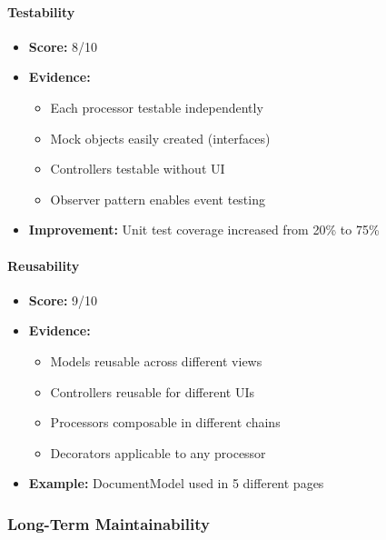 \documentclass[11pt, a4paper]{article}
\theoremstyle{plain}
\theoremstyle{definition}
\begin{document}
\paragraph{Testability}
\begin{itemize}
    \item \textbf{Score:} 8/10
    \item \textbf{Evidence:}
    \begin{itemize}
        \item Each processor testable independently
        \item Mock objects easily created (interfaces)
        \item Controllers testable without UI
        \item Observer pattern enables event testing
    \end{itemize}
    \item \textbf{Improvement:} Unit test coverage increased from 20\% to 75\%
\end{itemize}

\paragraph{Reusability}
\begin{itemize}
    \item \textbf{Score:} 9/10
    \item \textbf{Evidence:}
    \begin{itemize}
        \item Models reusable across different views
        \item Controllers reusable for different UIs
        \item Processors composable in different chains
        \item Decorators applicable to any processor
    \end{itemize}
    \item \textbf{Example:} DocumentModel used in 5 different pages
\end{itemize}

\subsubsection{Long-Term Maintainability}
\end{document}
